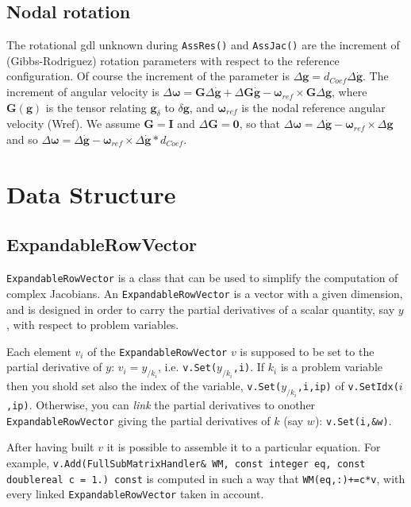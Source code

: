 \documentclass[10pt,dvips]{report}
\newcommand{\T}[1]{\boldsymbol{#1}}
\begin{document}
\section{Nodal rotation}
The rotational gdl unknown during \texttt{AssRes()} and \texttt{AssJac()}
are the increment of (Gibbs-Rodriguez) rotation parameters
with respect to the reference configuration.
Of course the increment of the parameter is
$\Delta \T g=d_{Coef}\Delta \dot{\T g}$.
The increment of angular velocity is 
$\Delta \T \omega = \T G\Delta \dot{\T g}+ \Delta \T G \dot{\T g}-
\T \omega_{ref}\times \T G \Delta \T g$,
where $\T G(\T g)$ is the tensor relating $\T g_\delta$ to $\delta \T g$,
and $\T \omega_{ref}$ is the nodal reference angular velocity (Wref).
We assume $\T G = \T I$ and $\Delta \T G = \T 0$,
so that $\Delta \T \omega = \Delta \dot{\T g}-\T \omega_{ref}\times\Delta \T g$
and so $\Delta \T \omega = \Delta \dot{\T g}-
\T \omega_{ref}\times\Delta \dot{\T g} * d_{Coef}$.

\chapter{Data Structure}
\section{ExpandableRowVector}
\texttt{ExpandableRowVector} is a class that can be used to
simplify the computation of complex Jacobians.
An \texttt{ExpandableRowVector} is a vector with a given dimension,
and is designed in order to carry the partial derivatives
of a scalar quantity, say $y$, with respect to problem variables.

\noindent
Each element $v_i$ of the \texttt{ExpandableRowVector} $v$ 
is supposed to be set to the partial derivative
of $y$: $v_i = y_{/k_i}$, i.e. \texttt{v.Set($y_{/k_i}$,i)}.
If $k_i$ is a problem variable then you shold set also
the index of the variable, \texttt{v.Set($y_{/k_i}$,i,ip)}
of \texttt{v.SetIdx($i$,ip)}. Otherwise, you can
\emph{link} the partial derivatives to onother \texttt{ExpandableRowVector}
giving the partial derivatives of $k$ (say $w$): \texttt{v.Set(i,\&w)}.

\noindent
After having built $v$ it is possible to assemble it 
to a particular equation. For example,
\texttt{v.Add(FullSubMatrixHandler\& WM, const integer eq, const doublereal c = 1.) const}
is computed in such a way that \texttt{WM(eq,:)+=c*v}, with every linked 
\texttt{ExpandableRowVector} taken in account.
\end{document}
